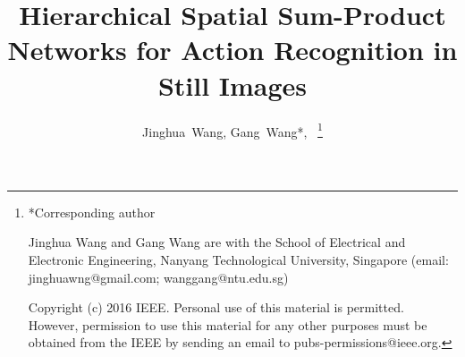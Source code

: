 \documentclass[journal]{IEEEtran}
\begin{document}
%
\title{Hierarchical Spatial Sum-Product Networks for Action Recognition in Still Images}
%
%
%

\author{Jinghua~Wang, Gang~Wang*,~
	\thanks{*Corresponding author
		
		
		Jinghua Wang and Gang Wang are with the School of Electrical and Electronic Engineering, Nanyang Technological University, Singapore (email: jinghuawng@gmail.com; wanggang@ntu.edu.sg)
		
		Copyright (c) 2016 IEEE. Personal use of this material is permitted.
		However, permission to use this material for any other purposes must be obtained from the IEEE by sending an email to pubs-permissions@ieee.org.
	}%
}

% 
%
\end{document}

